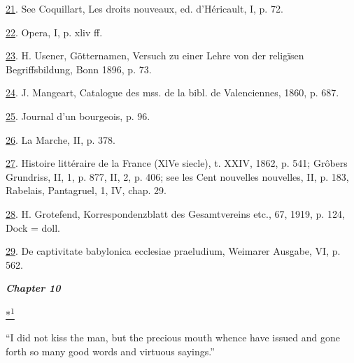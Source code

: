 \protect\hypertarget{23_NOTES.xhtmlux5cux23id_753}{\protect\hyperlink{16_Chapter_Nine__THE_DECLINE_OF_SYM.xhtmlux5cux23id_752}{21}}.
See Coquillart, Les droits nouveaux, ed. d'Héricault, I, p. 72.

\protect\hypertarget{23_NOTES.xhtmlux5cux23id_751}{\protect\hyperlink{16_Chapter_Nine__THE_DECLINE_OF_SYM.xhtmlux5cux23id_750}{22}}.
Opera, I, p. xliv ff.

\protect\hypertarget{23_NOTES.xhtmlux5cux23id_749}{\protect\hyperlink{16_Chapter_Nine__THE_DECLINE_OF_SYM.xhtmlux5cux23id_748}{23}}.
H. Usener, Götternamen, Versuch zu einer Lehre von der religïsen
Begriffsbildung, Bonn 1896, p. 73.

\protect\hypertarget{23_NOTES.xhtmlux5cux23id_747}{\protect\hyperlink{16_Chapter_Nine__THE_DECLINE_OF_SYM.xhtmlux5cux23id_746}{24}}.
J. Mangeart, Catalogue des mss. de la bibl. de Valenciennes, 1860, p.
687.

\protect\hypertarget{23_NOTES.xhtmlux5cux23id_745}{\protect\hyperlink{16_Chapter_Nine__THE_DECLINE_OF_SYM.xhtmlux5cux23id_744}{25}}.
Journal d'un bourgeois, p. 96.

\protect\hypertarget{23_NOTES.xhtmlux5cux23id_743}{\protect\hyperlink{16_Chapter_Nine__THE_DECLINE_OF_SYM.xhtmlux5cux23id_742}{26}}.
La Marche, II, p. 378.

\protect\hypertarget{23_NOTES.xhtmlux5cux23id_741}{\protect\hyperlink{16_Chapter_Nine__THE_DECLINE_OF_SYM.xhtmlux5cux23id_740}{27}}.
Histoire littéraire de la France (XlVe siecle), t. XXIV, 1862, p. 541;
Grôbers Grundriss, II, 1, p. 877, II, 2, p. 406; see les Cent nouvelles
nouvelles, II, p. 183, Rabelais, Pantagruel, 1, IV, chap. 29.

\protect\hypertarget{23_NOTES.xhtmlux5cux23id_739}{\protect\hyperlink{16_Chapter_Nine__THE_DECLINE_OF_SYM.xhtmlux5cux23id_738}{28}}.
H. Grotefend, Korrespondenzblatt des Gesamtvereins etc., 67, 1919, p.
124, Dock = doll.

\protect\hypertarget{23_NOTES.xhtmlux5cux23id_737}{\protect\hyperlink{16_Chapter_Nine__THE_DECLINE_OF_SYM.xhtmlux5cux23id_736}{29}}.
De captivitate babylonica ecclesiae praeludium, Weimarer Ausgabe, VI, p.
562.

\textbf{\emph{Chapter 10}}

\protect\hypertarget{23_NOTES.xhtmlux5cux23id_2584}{\protect\hyperlink{17_Chapter_Ten__THE_FAILURE_OF_IMAG.xhtmlux5cux23id_2583}{*\textsuperscript{1}}}
``I did not kiss the man, but the precious mouth whence have issued and
gone forth so many good words and virtuous sayings.''

